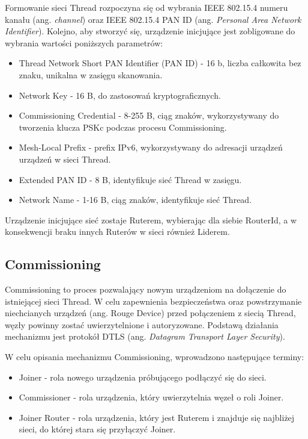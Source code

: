     Formowanie sieci Thread rozpoczyna się od wybrania IEEE 802.15.4 numeru kanału (ang. \textit{channel}) oraz IEEE 802.15.4 PAN ID (ang. \textit{Personal Area Network Identifier}). Kolejno, aby stworzyć się, urządzenie inicjujące jest zobligowane do wybrania wartości poniższych parametrów:
    \begin{itemize}
        \item Thread Network Short PAN Identifier (PAN ID) - 16 b, liczba całkowita bez znaku, unikalna w zasięgu skanowania.
        \item Network Key - 16 B, do zastosowań kryptograficznych.
        \item Commissioning Credential - 8-255 B, ciąg znaków, wykorzystywany do tworzenia klucza PSKc podczas procesu Commissioning.
        \item Mesh-Local Prefix - prefix IPv6, wykorzystywany do adresacji urządzeń urządzeń w sieci Thread.
        \item Extended PAN ID - 8 B, identyfikuje sieć Thread w zasięgu.
        \item Network Name - 1-16 B, ciąg znaków, identyfikuje sieć Thread.
    \end{itemize}{}

    Urządzenie inicjujące sieć zostaje Ruterem, wybierając dla siebie RouterId, a w konsekwencji braku innych Ruterów w sieci również Liderem.

    \subsection{Commissioning}

    Commissioning to proces pozwalający nowym urządzeniom na dołączenie do istniejącej sieci Thread. W celu zapewnienia bezpieczeństwa oraz powstrzymanie niechcianych urządzeń (ang. Rouge Device) przed połączeniem z siecią Thread, węzły powinny zostać uwierzytelnione i autoryzowane. Podstawą działania mechanizmu jest protokół DTLS (ang. \textit{Datagram Transport Layer Security}).

    W celu opisania mechanizmu Commissioning, wprowadzono następujące terminy:
    \begin{itemize}
        \item Joiner - rola nowego urządzenia próbującego podłączyć się do sieci.
        \item Commissioner - rola urządzenia, który uwierzytelnia węzeł o roli Joiner.
        \item Joiner Router - rola urządzenia, który jest Ruterem i znajduje się najbliżej sieci, do której stara się przyłączyć Joiner.
    \end{itemize}

